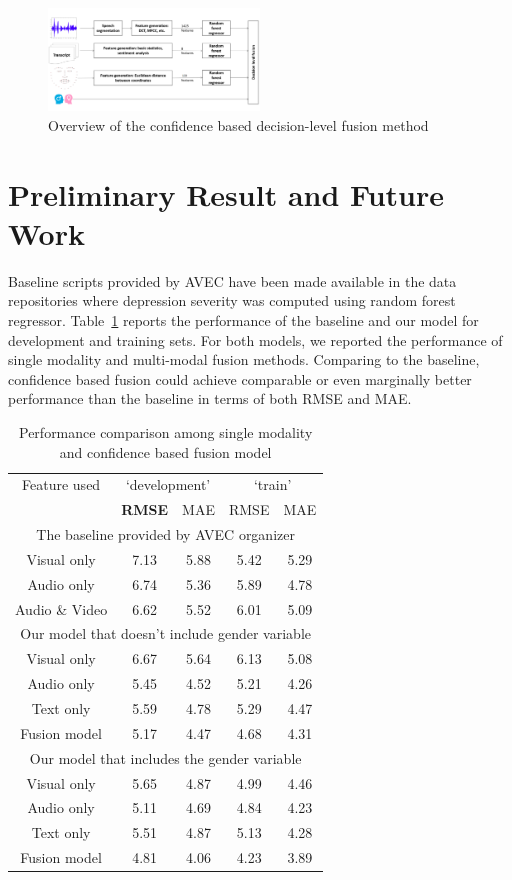\documentclass[letterpaper]{article} %
\begin{document}
\begin{figure}[ht]
\centering
\includegraphics[width=0.5\textwidth]{framework}
\caption{Overview of the confidence based decision-level fusion method}
\label{fig:framework}
\end{figure}

\section{Preliminary Result and Future Work }
Baseline scripts provided by AVEC have been made available in the data repositories where depression severity was computed using random forest regressor.
Table~\ref{tab:perf_fusion} reports the performance of the baseline and our model for development and training sets. For both models, we reported the performance of single modality and multi-modal fusion methods. Comparing to the baseline, confidence based fusion could achieve comparable or even marginally better performance than the baseline in terms of both RMSE and MAE.


\begin{table}[thp]
\caption{Performance comparison among single modality and confidence based fusion model}
\centering
\label{tab:perf_fusion}
\begin{tabular}{  c| c c | c c }
\hline
Feature used & \multicolumn{2}{c}{`development'} & \multicolumn{2}{c}{`train'} \\
& \textbf{RMSE} & MAE & RMSE & MAE \\
\hline \hline
\multicolumn{5}{c}{The baseline provided by AVEC organizer} \\
\hline
Visual only & 7.13 & 5.88 & 5.42 & 5.29 \\
Audio only & 6.74 & 5.36 & 5.89 & 4.78 \\
Audio \& Video & 6.62 & 5.52 & 6.01 & 5.09 \\
\hline
\multicolumn{5}{c}{Our model that doesn't include gender variable} \\
\hline
Visual only & 6.67 & 5.64 & 6.13 & 5.08 \\
Audio only & 5.45 & 4.52 & 5.21 & 4.26 \\
Text only & 5.59 & 4.78 & 5.29 & 4.47 \\
Fusion model & 5.17 & 4.47 & 4.68 & 4.31 \\
\hline
\multicolumn{5}{c}{Our model that includes the gender variable} \\
\hline
Visual only & 5.65 & 4.87 & 4.99 & 4.46 \\
Audio only & 5.11 & 4.69 & 4.84 & 4.23 \\
Text only & 5.51 & 4.87 & 5.13 & 4.28 \\
Fusion model & 4.81 & 4.06 & 4.23 & 3.89 \\
\hline
\end{tabular}
\end{table}
\end{document}
